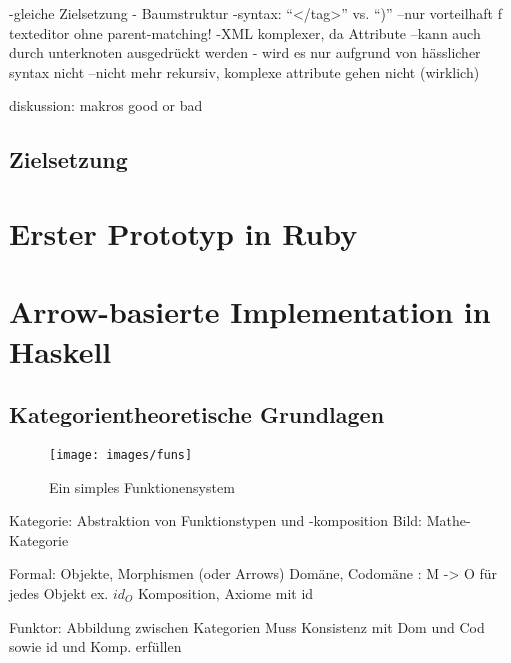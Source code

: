 \documentclass[a4paper, bibgerm]{article}
\begin{document}
-gleiche Zielsetzung - Baumstruktur
-syntax: ``</tag>'' vs. ``)''
--nur vorteilhaft f texteditor ohne parent-matching!
-XML komplexer, da Attribute
--kann auch durch unterknoten ausgedrückt werden - wird es nur aufgrund
von hässlicher syntax nicht
--nicht mehr rekursiv, komplexe attribute gehen nicht (wirklich)

diskussion: makros good or bad

\subsection{Zielsetzung}
\label{sec:intro:goal}

\section{Erster Prototyp in Ruby}
\label{sec:sexy}

\section{Arrow-basierte Implementation in Haskell}
\label{sec:magicl}

\subsection{Kategorientheoretische Grundlagen}
\label{sec:magicl:cats}

\begin{figure}
  \centering
  \texttt{[image: images/funs]}
  \caption{Ein simples Funktionensystem}
  \label{fig:cat:funs}
\end{figure}

Kategorie: Abstraktion von Funktionstypen und -komposition
Bild: Mathe-Kategorie

Formal: Objekte, Morphismen (oder Arrows)
Domäne, Codomäne : M -> O
für jedes Objekt ex. $id_O$
Komposition, Axiome mit id

Funktor: Abbildung zwischen Kategorien
Muss Konsistenz mit Dom und Cod sowie id und Komp. erfüllen
\end{document}
